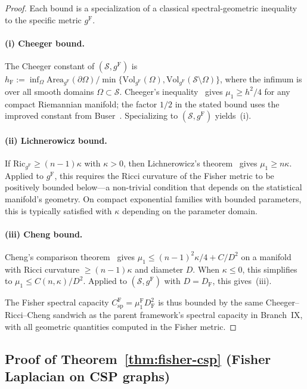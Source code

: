 \documentclass[11pt]{article}
\newcommand{\gF}{g^{\mathrm{F}}}
\theoremstyle{remark}
\begin{document}
\begin{proof}
Each bound is a specialization of a classical spectral-geometric inequality
to the specific metric $\gF$.

\paragraph{(i) Cheeger bound.}
The Cheeger constant of $(\mathcal{S}, \gF)$ is
$h_{\mathrm{F}} := \inf_{\Omega} \mathrm{Area}_{\gF}(\partial\Omega) /
\min\{\mathrm{Vol}_{\gF}(\Omega),
\mathrm{Vol}_{\gF}(\mathcal{S} \setminus \Omega)\}$,
where the infimum is over all smooth domains $\Omega \subset \mathcal{S}$.
Cheeger's inequality~\cite{cheeger1970} gives
$\mu_1 \ge h^2/4$ for any compact Riemannian manifold; the factor $1/2$
in the stated bound uses the improved constant from
Buser~\cite{buser1982}.  Specializing to $(\mathcal{S}, \gF)$ yields~(i).

\paragraph{(ii) Lichnerowicz bound.}
If $\mathrm{Ric}_{\gF} \ge (n-1)\kappa$ with $\kappa > 0$, then
Lichnerowicz's theorem~\cite{lichnerowicz1958} gives
$\mu_1 \ge n\kappa$.  Applied to $\gF$, this requires the Ricci curvature
of the Fisher metric to be positively bounded below---a non-trivial
condition that depends on the statistical manifold's geometry.  On compact
exponential families with bounded parameters, this is typically satisfied
with $\kappa$ depending on the parameter domain.

\paragraph{(iii) Cheng bound.}
Cheng's comparison theorem~\cite{cheng1975} gives
$\mu_1 \le (n-1)^2 \kappa / 4 + C/D^2$ on a manifold with Ricci curvature
$\ge (n-1)\kappa$ and diameter $D$.  When $\kappa \le 0$, this simplifies to
$\mu_1 \le C(n,\kappa)/D^2$.  Applied to $(\mathcal{S}, \gF)$ with
$D = D_{\mathrm{F}}$, this gives~(iii).

The Fisher spectral capacity
$C_{\mathrm{sp}}^{\mathrm{F}} = \mu_1^{\mathrm{F}} D_{\mathrm{F}}^2$
is thus bounded by the same Cheeger--Ricci--Cheng sandwich as the parent
framework's spectral capacity in Branch~IX, with all geometric quantities
computed in the Fisher metric.
\end{proof}

\subsection{Proof of Theorem~\ref{thm:fisher-csp}
(Fisher Laplacian on CSP graphs)}
\label{subsec:proof-fisher-csp}
\end{document}
